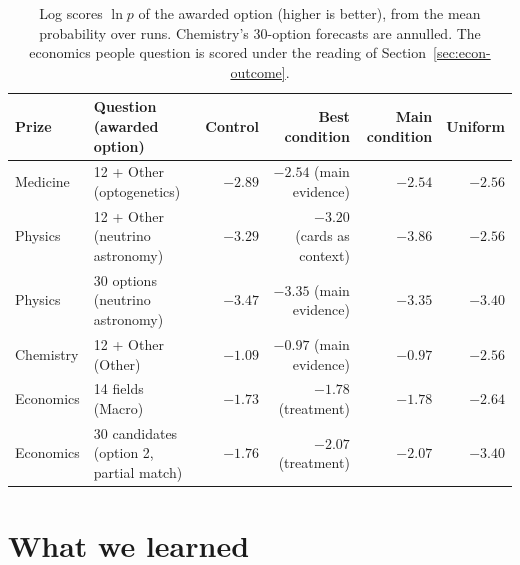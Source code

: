 \documentclass[11pt,a4paper]{article}
\begin{document}
\begin{table}[htbp]
\small
\begin{tabularx}{\textwidth}{@{}lLrrrr@{}}
\toprule
Prize & Question (awarded option) & Control & Best condition & Main condition & Uniform \\
\midrule
Medicine & 12 + Other (optogenetics) & $-2.89$ & $-2.54$ (main evidence) & $-2.54$ & $-2.56$ \\
Physics & 12 + Other (neutrino astronomy) & $-3.29$ & $-3.20$ (cards as context) & $-3.86$ & $-2.56$ \\
Physics & 30 options (neutrino astronomy) & $-3.47$ & $-3.35$ (main evidence) & $-3.35$ & $-3.40$ \\
Chemistry & 12 + Other (Other) & $-1.09$ & $-0.97$ (main evidence) & $-0.97$ & $-2.56$ \\
Economics & 14 fields (Macro) & $-1.73$ & $-1.78$ (treatment) & $-1.78$ & $-2.64$ \\
Economics & 30 candidates (option 2, partial match) & $-1.76$ & $-2.07$ (treatment) & $-2.07$ & $-3.40$ \\
\bottomrule
\end{tabularx}
\caption{Log scores $\ln p$ of the awarded option (higher is better), from the mean probability over runs.
Chemistry's 30-option forecasts are annulled. The economics people question is scored under the reading of
Section~\ref{sec:econ-outcome}.}
\end{table}

\section{What we learned}\label{sec:lessons}
\end{document}
